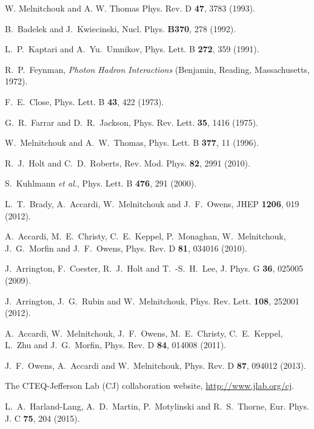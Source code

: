 \documentclass[aps,prd,amsmath,preprint]{revtex4}
\begin{document}
\begin{thebibliography}{99}

W. Melnitchouk and A. W. Thomas
Phys. Rev. D {\bf 47}, 3783 (1993).

B.~Badelek and J.~Kwiecinski,
Nucl. Phys. {\bf B370}, 278 (1992).

L.~P.~Kaptari and A.~Yu.~Umnikov,
Phys. Lett. B {\bf 272}, 359 (1991).

R.~P.~Feynman, {\em Photon Hadron Interactions}
(Benjamin, Reading, Massachusetts, 1972).

F.~E.~Close,
Phys. Lett. B {\bf 43}, 422 (1973).

G.~R.~Farrar and D.~R.~Jackson,
Phys. Rev. Lett. {\bf 35}, 1416 (1975).

W.~Melnitchouk and A.~W.~Thomas,
Phys. Lett. B {\bf 377}, 11 (1996).

R.~J.~Holt and C.~D.~Roberts,
Rev. Mod. Phys. {\bf 82}, 2991 (2010).

S.~Kuhlmann {\it et al.},
Phys. Lett. B {\bf 476}, 291 (2000).

L.~T.~Brady, A.~Accardi, W.~Melnitchouk and J.~F.~Owens,
JHEP {\bf 1206}, 019 (2012).

A.~Accardi, M.~E.~Christy, C.~E.~Keppel, P.~Monaghan, W.~Melnitchouk,
J.~G.~Morfin and J.~F.~Owens,
Phys. Rev. D {\bf 81}, 034016 (2010).

J.~Arrington, F.~Coester, R.~J.~Holt and T.~-S.~H.~Lee,
J. Phys. G {\bf 36}, 025005 (2009).

J.~Arrington, J.~G.~Rubin and W.~Melnitchouk,
Phys. Rev. Lett. {\bf 108}, 252001 (2012).

A.~Accardi, W.~Melnitchouk, J.~F.~Owens, M.~E.~Christy, C.~E.~Keppel,
L.~Zhu and J.~G.~Morfin,
Phys. Rev. D {\bf 84}, 014008 (2011).

J.~F.~Owens, A.~Accardi and W.~Melnitchouk,
Phys. Rev. D {\bf 87}, 094012 (2013).

The CTEQ-Jefferson Lab (CJ) collaboration website,
\url{http://www.jlab.org/cj}.

L.~A.~Harland-Lang, A.~D.~Martin, P.~Motylinski and R.~S.~Thorne,
Eur. Phys. J. C {\bf 75}, 204 (2015).



\end{thebibliography}
\end{document}
